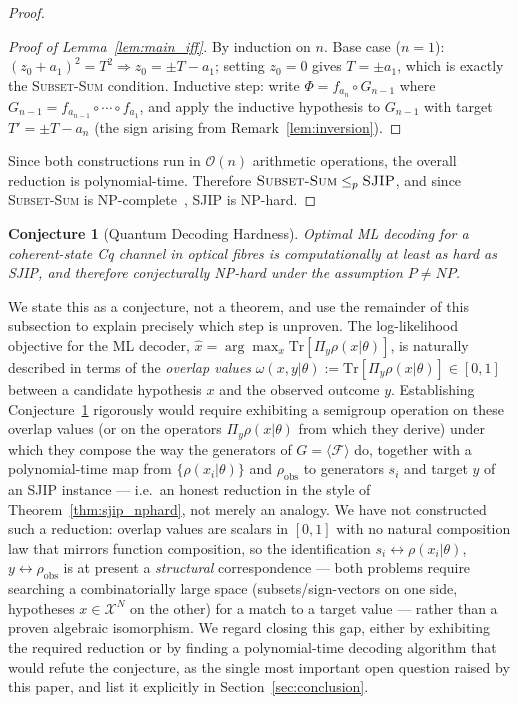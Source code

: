 \documentclass[journal,twocolumn]{IEEEtran}
\theoremstyle{definition}
\theoremstyle{plain}
\newtheorem{conjecture}[theorem]{Conjecture}
\newcommand{\Tr}{\mathrm{Tr}}
\begin{document}
\begin{proof}
\begin{proof}[Proof of Lemma~\ref{lem:main_iff}]
By induction on $n$.  Base case ($n=1$): $(z_0 + a_1)^2 = T^2
\Rightarrow z_0 = \pm T - a_1$; setting $z_0 = 0$ gives $T = \pm
a_1$, which is exactly the \textsc{Subset-Sum} condition. Inductive
step: write $\Phi = f_{a_n} \circ G_{n-1}$ where $G_{n-1} =
f_{a_{n-1}} \circ \cdots \circ f_{a_1}$, and apply the inductive
hypothesis to $G_{n-1}$ with target $T' = \pm T - a_n$ (the sign
arising from Remark~\ref{lem:inversion}).
\end{proof}

Since both constructions run in $\mathcal{O}(n)$ arithmetic
operations, the overall reduction is polynomial-time.  Therefore
$\textsc{Subset-Sum} \le_p \textsc{SJIP}$, and since
\textsc{Subset-Sum} is NP-complete~\cite{garey1979}, SJIP is NP-hard.
\end{proof}

\begin{conjecture}[Quantum Decoding Hardness]
\label{thm:decoding_hard}
Optimal ML decoding for a coherent-state Cq channel in optical
fibres is computationally at least as hard as SJIP, and therefore
conjecturally NP-hard under the assumption $P \ne NP$.
\end{conjecture}

We state this as a conjecture, not a theorem, and use the remainder
of this subsection to explain precisely which step is unproven. The
log-likelihood objective for the ML decoder, $\hat x = \arg\max_x
\Tr[\Pi_y \rho(x|\theta)]$, is naturally described in terms of the
\emph{overlap values} $\omega(x,y|\theta) := \Tr[\Pi_y \rho(x|\theta)]
\in [0,1]$ between a candidate hypothesis $x$ and the observed
outcome $y$. Establishing Conjecture~\ref{thm:decoding_hard}
rigorously would require exhibiting a semigroup operation on these
overlap values (or on the operators $\Pi_y\rho(x|\theta)$ from which
they derive) under which they compose the way the generators of
$G=\langle\mathcal F\rangle$ do, together with a polynomial-time map
from $\{\rho(x_i|\theta)\}$ and $\rho_{\mathrm{obs}}$ to generators
$s_i$ and target $y$ of an SJIP instance --- i.e.\ an honest
reduction in the style of Theorem~\ref{thm:sjip_nphard}, not merely
an analogy.  We have not constructed such a reduction: overlap
values are scalars in $[0,1]$ with no natural composition law that
mirrors function composition, so the identification $s_i
\leftrightarrow \rho(x_i|\theta)$, $y \leftrightarrow
\rho_{\mathrm{obs}}$ is at present a \emph{structural} correspondence
--- both problems require searching a combinatorially large space
(subsets/sign-vectors on one side, hypotheses $x\in\mathcal X^N$ on
the other) for a match to a target value --- rather than a proven
algebraic isomorphism. We regard closing this gap, either by
exhibiting the required reduction or by finding a polynomial-time
decoding algorithm that would refute the conjecture, as the single
most important open question raised by this paper, and list it
explicitly in Section~\ref{sec:conclusion}.
\end{document}
